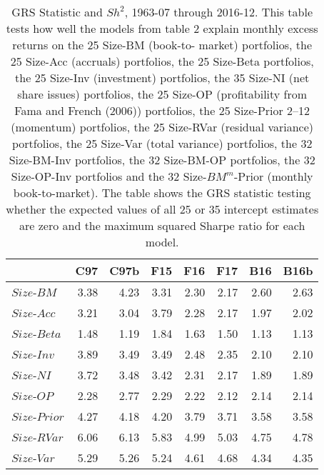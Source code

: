 
\begin{table}[!ht]
\centering
\caption{
\scriptsize{
GRS Statistic and $Sh^2$, 1963-07 through 2016-12. This table tests how well the models
from table 2 explain monthly excess returns on the 25 Size-BM (book-to- market)
portfolios, the 25 Size-Acc (accruals) portfolios, the 25 Size-Beta portfolios, the 25
Size-Inv (investment) portfolios, the 35 Size-NI (net share issues) portfolios, the 25
Size-OP (profitability from Fama and French (2006)) portfolios, the 25 Size-Prior 2–12
(momentum) portfolios, the 25 Size-RVar (residual variance) portfolios, the 25 Size-Var
(total variance) portfolios, the 32 Size-BM-Inv portfolios, the 32 Size-BM-OP portfolios,
the 32 Size-OP-Inv portfolios and the 32 Size-$BM^m$-Prior (monthly book-to-market). The
table shows the GRS statistic testing whether the expected values of all 25 or 35
intercept estimates are zero and the maximum squared Sharpe ratio for each model.
}
}
\begin{tabular}{lrrrrrrr}
  \toprule
     & C97  & C97b  & F15  & F16  & F17  & B16  & B16b  \\
  \midrule
  
    $Size$-$BM$  & 3.38  & 4.23  & 3.31  & 2.30  & 2.17  & 2.60  & 2.63  \\
  
    $Size$-$Acc$  & 3.21  & 3.04  & 3.79  & 2.28  & 2.17  & 1.97  & 2.02  \\
  
    $Size$-$Beta$  & 1.48  & 1.19  & 1.84  & 1.63  & 1.50  & 1.13  & 1.13  \\
  
    $Size$-$Inv$  & 3.89  & 3.49  & 3.49  & 2.48  & 2.35  & 2.10  & 2.10  \\
  
    $Size$-$NI$  & 3.72  & 3.48  & 3.42  & 2.31  & 2.17  & 1.89  & 1.89  \\
  
    $Size$-$OP$  & 2.28  & 2.77  & 2.29  & 2.22  & 2.12  & 2.14  & 2.14  \\
  
    $Size$-$Prior$  & 4.27  & 4.18  & 4.20  & 3.79  & 3.71  & 3.58  & 3.58  \\
  
    $Size$-$RVar$  & 6.06  & 6.13  & 5.83  & 4.99  & 5.03  & 4.75  & 4.78  \\
  
    $Size$-$Var$  & 5.29  & 5.26  & 5.24  & 4.61  & 4.68  & 4.34  & 4.35  \\
  

\end{tabular}
\end{table}
